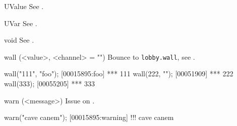 \begin{urbiscriptapi}


\item[UValue] See .


\item[UVar] See .


\item[void] See .


\item[wall](<value>, <channel> = "")%
  Bounce to \lstinline|lobby.wall|, see .
\begin{urbiscript}
wall("111", "foo");
[00015895:foo] *** 111
wall(222, "");
[00051909] *** 222
wall(333);
[00055205] *** 333
\end{urbiscript}


\item[warn](<message>)%
  Issue  on .
\begin{urbiscript}
warn("cave canem");
[00015895:warning] !!! cave canem
\end{urbiscript}
\end{urbiscriptapi}

